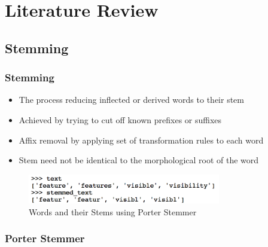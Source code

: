 \documentclass{beamer}
\begin{document}
\section{Literature Review}
\subsection{Stemming}

\begin{frame}
\frametitle{Stemming}
\begin{itemize}
\item The process reducing inflected or derived words to their stem
\item Achieved by trying to cut off known prefixes or suffixes \cite{Stem}
\item Affix removal by applying set of transformation rules to each word
\item Stem need not be identical to the morphological root of the word
\end{itemize}

\begin{figure}[h]
\centering
\includegraphics[width=0.75\textwidth]{img/stem.png}
\caption{Words and their Stems using Porter Stemmer}
\label{fig:stem}
\end{figure}

\end{frame}

\subsubsection{Porter Stemmer}
\end{document}
